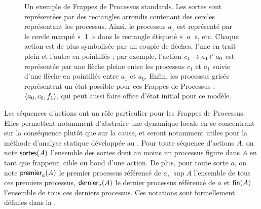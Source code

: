 \begin{example}
  \begin{figure}[ht]
  \begin{center}
  \caption{%
    Un exemple de Frappes de Processus standards.
    Les sortes sont représentées par des rectangles arrondis 
    contenant des cercles représentant les processus.
    Ainsi, le processus $a_1$ est représenté par le cercle marqué «~1~»
    dans le rectangle étiqueté «~$a$~», etc.
    Chaque action est de plus symbolisée par un couple de flèches,
    l'une en trait plein et l'autre en pointillés ;
    par exemple, l'action $c_1\rightarrow a_1\Rsh a_0$
    est représentée par une flèche pleine entre les processus $c_1$ et $a_1$
    suivie d'une flèche en pointillés entre $a_1$ et $a_0$.
    Enfin, les processus grisés représentent un état possible
    pour ces Frappes de Processus : $\mbox{$\langle a_0, c_0, f_1 \rangle$}$, qui peut aussi faire office
    d'état initial pour ce modèle.
  }
  \end{center}
  \end{figure}
\end{example}

Les séquences d'actions ont un rôle particulier pour les Frappes de Processus.
Elles permettent notamment d'abstraire une dynamique locale en se concentrant
sur la conséquence plutôt que sur la cause,
et seront notamment utiles pour la méthode d'analyse statique développée
au .
Pour toute séquence d'actions $A$,
on note $\mathsf{sortes}(A)$ l'ensemble des sortes dont au moins un processus figure dans $A$
en tant que frappeur, cible ou bond d'une action.
De plus, pour toute sorte $a$,
on note $\mathsf{premier}_{a}(A)$ le premier processus référencé de $a$,
$\sup{A}$ l'ensemble de tous ces premiers processus,
$\mathsf{dernier}_{a}(A)$ le dernier processus référencé de $a$
et $\mathsf{fin}(A)$ l'ensemble de tous ces derniers processus.
Ces notations sont formellement définies dans la .

